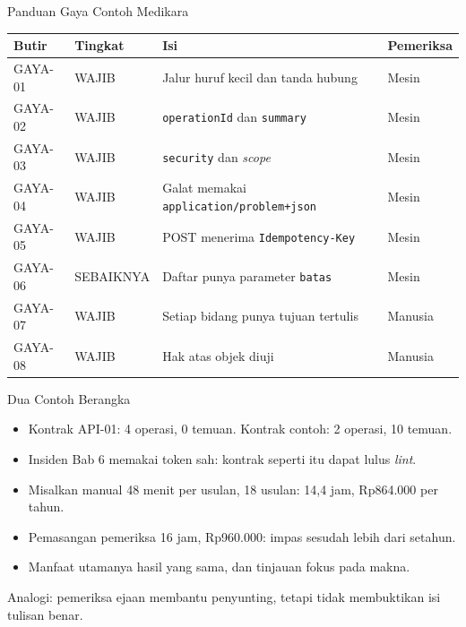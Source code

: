 \documentclass[aspectratio=169, table, 12pt]{beamer}
\begin{document}
\begin{frame}{{\Large Panduan Gaya Contoh Medikara}}
  \footnotesize
  \begin{tabularx}{\textwidth}{>{\raggedright\arraybackslash}p{1.7cm} >{\raggedright\arraybackslash}p{2.2cm} >{\raggedright\arraybackslash}X >{\raggedright\arraybackslash}p{1.9cm}}
    \hline
    \textbf{Butir} & \textbf{Tingkat} & \textbf{Isi} & \textbf{Pemeriksa} \\ \hline
    GAYA-01 & WAJIB & Jalur huruf kecil dan tanda hubung & Mesin \\ \hline
    GAYA-02 & WAJIB & \texttt{operationId} dan \texttt{summary} & Mesin \\ \hline
    GAYA-03 & WAJIB & \texttt{security} dan \textit{scope} & Mesin \\ \hline
    GAYA-04 & WAJIB & Galat memakai \texttt{application/problem+json} & Mesin \\ \hline
    GAYA-05 & WAJIB & POST menerima \texttt{Idempotency-Key} & Mesin \\ \hline
    GAYA-06 & SEBAIKNYA & Daftar punya parameter \texttt{batas} & Mesin \\ \hline
    GAYA-07 & WAJIB & Setiap bidang punya tujuan tertulis & Manusia \\ \hline
    GAYA-08 & WAJIB & Hak atas objek diuji & Manusia \\ \hline
  \end{tabularx}
\end{frame}

\begin{frame}{{\Large Dua Contoh Berangka}}
  \vspace{8pt}
  \begin{itemize}
    \item Kontrak API-01: 4 operasi, 0 temuan. Kontrak contoh: 2 operasi, 10 temuan.
    \item Insiden Bab 6 memakai token sah: kontrak seperti itu dapat lulus \textit{lint}.
    \item Misalkan manual 48 menit per usulan, 18 usulan: 14,4 jam, Rp864.000 per tahun.
    \item Pemasangan pemeriksa 16 jam, Rp960.000: impas sesudah lebih dari setahun.
    \item Manfaat utamanya hasil yang sama, dan tinjauan fokus pada makna.
  \end{itemize}
  \vspace{4pt}
  {\small Analogi: pemeriksa ejaan membantu penyunting, tetapi tidak membuktikan isi tulisan benar.}
\end{frame}
\end{document}

